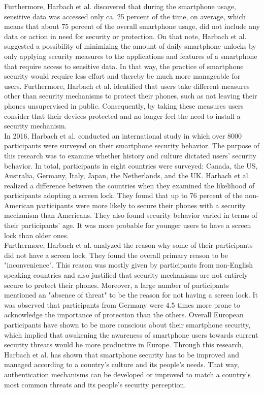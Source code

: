 Furthermore, Harbach et al. \cite{harbach} discovered that during the smartphone usage, sensitive data was accessed only ca. 25 percent of the time, on average, which means that about 75 percent of the overall smartphone usage, did not include any data or action in need for security or protection. On that note, Harbach et al. suggested a possibility of minimizing the amount of daily smartphone unlocks by only applying security measures to the applications and features of a smartphone that require access to sensitive data. In that way, the practice of smartphone security would require less effort and thereby be much more manageable for users. Furthermore, Harbach et al. \cite{harbach} identified that users take different measures other than security mechanisms to protect their phones, such as not leaving their phones unsupervised in public. Consequently, by taking these measures users consider that their devices protected and no longer feel the need to install a security mechanism.\\

In 2016, Harbach et al. \cite{Harbach:2016} conducted an international study in which over 8000 participants were surveyed on their smartphone security behavior. The purpose of this research was to examine whether history and culture dictated users' security behavior. In total, participants in eight countries were surveyed: Canada, the US, Australia, Germany, Italy, Japan, the Netherlands, and the UK. Harbach et al. \cite{Harbach:2016} realized a difference between the countries when they examined the likelihood of participants adopting a screen lock. They found that up to 76 percent of the non-American participants were more likely to secure their phones with a security mechanism than Americans. They also found security behavior varied in terms of their participants' age. It was more probable for younger users to have a screen lock than older ones.\\

Furthermore, Harbach et al. \cite{Harbach:2016} analyzed the reason why some of their participants did not have a screen lock. They found the overall primary reason to be "inconvenience". This reason was mostly given by participants from non-English speaking countries and also justified that security mechanisms are not entirely secure to protect their phones. Moreover, a large number of participants mentioned an "absence of threat" to be the reason for not having a screen lock. It was observed that participants from Germany were 4.5 times more prone to acknowledge the importance of protection than the others. Overall European participants have shown to be more conscious about their smartphone security, which implied that awakening the awareness of smartphone users towards current security threats would be more productive in Europe. Through this research, Harbach et al. \cite{Harbach:2016} has shown that smartphone security has to be improved and managed according to a country's culture and its people's needs. That way, authentication mechanisms can be developed or improved to match a country's most common threats and its people's security perception.\\ 


